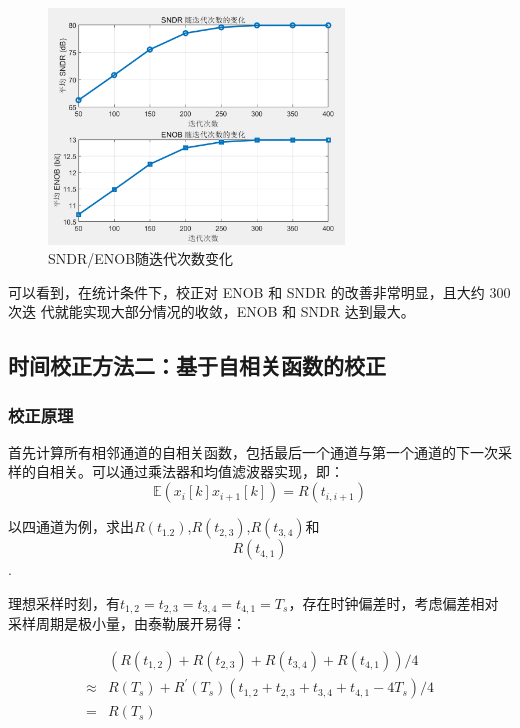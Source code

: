 \documentclass[cs4size,a4paper]{ctexart}
\numberwithin{equation}{section}
\numberwithin{table}{section}
\numberwithin{figure}{section}
\begin{document}
		\begin{figure}[H]
			\centering
			\includegraphics[width=0.7\textwidth]{figure/result6.png}
			\caption{SNDR/ENOB随迭代次数变化} 
			\label{fig:result6}
		\end{figure}
		
		可以看到，在统计条件下，校正对 ENOB 和 SNDR 的改善非常明显，且大约 300 次迭
		代就能实现大部分情况的收敛，ENOB 和 SNDR 达到最大。
		
		
		\subsection{时间校正方法二：基于自相关函数的校正}
		
		\subsubsection{校正原理}
		
		\noindent
		首先计算所有相邻通道的自相关函数，包括最后一个通道与第一个通道的下一次采样的自相关。可以通过乘法器和均值滤波器实现，即：
		\begin{equation}
			\mathbb{E}\left(x_i[k] x_{i+1}[k]\right)=R\left(t_{i, i+1}\right)
		\end{equation}
		
		以四通道为例，求出$R\left(t_{1.2}\right)$,$R\left(t_{2,3}\right)$,$R\left(t_{3,4}\right)$和$$R\left(t_{4,1}\right)$$.
		
		理想采样时刻，有$t_{1,2}=t_{2,3}=t_{3,4}=t_{4,1}=T_s$，存在时钟偏差时，考虑偏差相对采样周期是极小量，由泰勒展开易得：
		
		\begin{equation}
			\begin{aligned}
				& \left(R\left(t_{1,2}\right)+R\left(t_{2,3}\right)+R\left(t_{3,4}\right)+R\left(t_{4,1}\right)\right) / 4 \\
				\approx & R\left(T_s\right)+R^{\prime}\left(T_s\right)\left(t_{1,2}+t_{2,3}+t_{3,4}+t_{4,1}-4 T_s\right) / 4 \\
				= & R\left(T_s\right)
			\end{aligned}
		\end{equation}
		
\end{document}
